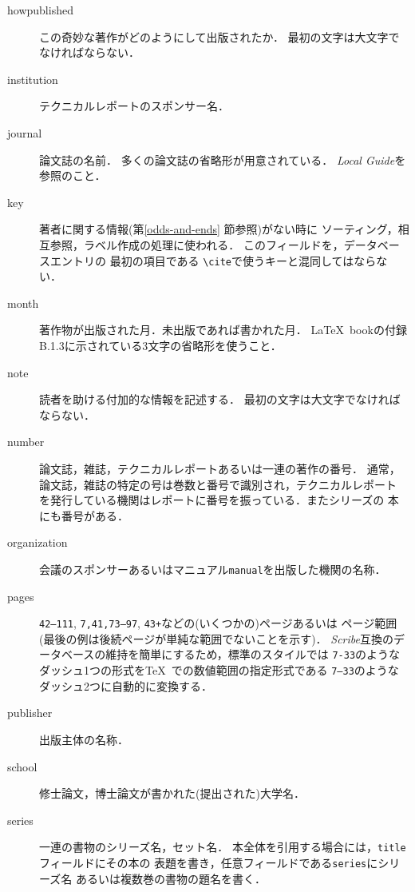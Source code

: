\begin{description}
\item[howpublished\hfill]
この奇妙な著作がどのようにして出版されたか．
最初の文字は大文字でなければならない．

\item[institution\hfill]
テクニカルレポートのスポンサー名．

\item[journal\hfill]
論文誌の名前．
多くの論文誌の省略形が用意されている．
{\it Local Guide}を参照のこと．

\item[key\hfill]
著者に関する情報(第\ref{odds-and-ends} 節参照)がない時に
ソーティング，相互参照，ラベル作成の処理に使われる．
このフィールドを，データベースエントリの
最初の項目である \verb|\cite|で使うキーと混同してはならない．

\item[month\hfill]
著作物が出版された月．未出版であれば書かれた月．
\LaTeX\ bookの付録B.1.3に示されている3文字の省略形を使うこと．

\item[note\hfill]
読者を助ける付加的な情報を記述する．
最初の文字は大文字でなければならない．

\item[number\hfill]
論文誌，雑誌，テクニカルレポートあるいは一連の著作の番号．
通常，論文誌，雑誌の特定の号は巻数と番号で識別され，テクニカルレポート
を発行している機関はレポートに番号を振っている．またシリーズの
本にも番号がある．

\item[organization\hfill]
会議のスポンサーあるいはマニュアル{\tt manual}を出版した機関の名称．

\item[pages\hfill]
{\tt 42--111}, {\tt 7,41,73--97}, {\tt 43+}などの(いくつかの)ページあるいは
ページ範囲(最後の例は後続ページが単純な範囲でないことを示す)．
{\em Scribe}互換のデータベースの維持を簡単にするため，標準のスタイルでは
{\tt 7-33}のようなダッシュ1つの形式を\TeX\ での数値範囲の指定形式である
{\tt 7--33}のようなダッシュ2つに自動的に変換する．

\item[publisher\hfill]
出版主体の名称．

\item[school\hfill]
修士論文，博士論文が書かれた(提出された)大学名．

\item[series\hfill]
一連の書物のシリーズ名，セット名．
本全体を引用する場合には，{\tt title}フィールドにその本の
表題を書き，任意フィールドである{\tt series}にシリーズ名
あるいは複数巻の書物の題名を書く．


\end{description}
